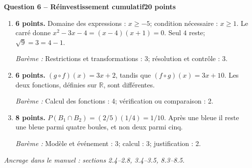 \documentclass[11pt,a4paper]{article}
\begin{document}
\newpage
{\large\bfseries Question 6 -- Réinvestissement cumulatif}\hfill\textbf{20 points}\par
\begin{enumerate}
\item \textbf{6 points.} Domaine des expressions : \(x\ge-5\); condition nécessaire : \(x\ge1\). Le carré donne \(x^2-3x-4=(x-4)(x+1)=0\). Seul \(4\) reste; \(\sqrt9=3=4-1\).
\par{\small\textit{Barème : }Restrictions et transformations : 3; résolution et contrôle : 3.}
\item \textbf{6 points.} \((g\circ f)(x)=3x+2\), tandis que \((f\circ g)(x)=3x+10\). Les deux fonctions, définies sur \(\mathbb R\), sont différentes.
\par{\small\textit{Barème : }Calcul des fonctions : 4; vérification ou comparaison : 2.}
\item \textbf{8 points.} \(P(B_1\cap B_2)=(2/5)(1/4)=1/10\). Après une bleue il reste une bleue parmi quatre boules, et non deux parmi cinq.
\par{\small\textit{Barème : }Modèle et événement : 3; calcul : 3; justification : 2.}
\end{enumerate}
\vfill {\small\textit{Ancrage dans le manuel : sections 2.4--2.8, 3.4--3.5, 8.3--8.5.}}
\end{document}
